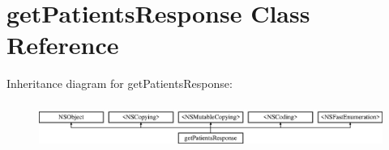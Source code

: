 \hypertarget{interfaceget_patients_response}{}\section{get\+Patients\+Response Class Reference}
\label{interfaceget_patients_response}
Inheritance diagram for get\+Patients\+Response\+:\begin{figure}[H]
\begin{center}
\leavevmode
\includegraphics[height=1.544828cm]{interfaceget_patients_response}
\end{center}
\end{figure}
